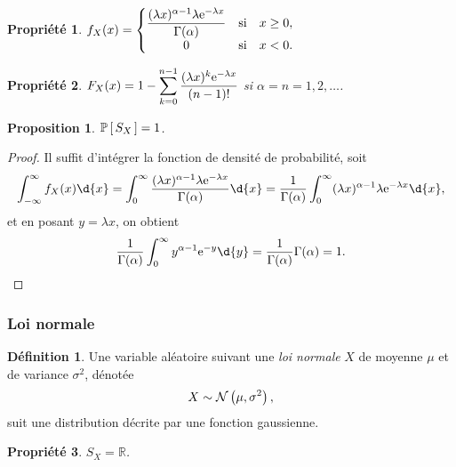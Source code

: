 \documentclass[11pt]{article}
\makeatletter
\renewcommand\P[1]{%
	\ensuremath{%
		\mathbb{P}\left[\,#1\,\right]%
	}%
}%
\newcommand\e{%
	\ensuremath{%
		\mathrm{e}%
	}%
}%
\newcommand\Norm[2]{%
	\ensuremath{%
		\mathcal{N}\left(#1,#2\right)%
	}%
}%
\newtheorem*{proposition}{Proposition}
\newtheorem{property}{Propriété}
\theoremstyle{remark}
\theoremstyle{definition}
\newtheorem*{@definition}{Définition}
\newenvironment{definition}{%
	\begin{@definition}%
}{%
	\end{@definition}%
	\setcounter{property}{0}%
}
\makeatother
\begin{document}
\begin{property}
	$f_X(x)=\left\{
		\begin{matrix}
			\dfrac{(\lambda x)^{\alpha-1}\lambda\e^{-\lambda x}}
				{\Gamma(\alpha)} & \text{si} & x\geq 0,\\
			0                    & \text{si} & x<0.\\
		\end{matrix}
	\right.$
\end{property}

\begin{property}
	$F_X(x)=1-\displaystyle\sum_{k=0}^{n-1}\frac{(\lambda x)^k\e^{-\lambda x}}
		{(n-1)!}$ si $\alpha=n=1,2,\dots$.
\end{property}

\begin{proposition}
	$\P{S_X}=1$.
\end{proposition}

\begin{proof}
	Il suffit d'intégrer la fonction de densité de probabilité, soit
	\begin{equation*}
		\int_{-\infty}^\infty f_X(x)\d{x}
		=\int_0^\infty\frac{(\lambda x)^{\alpha-1}\lambda\e^{-\lambda x}}
			{\Gamma(\alpha)}\d{x}
		=\frac{1}{\Gamma(\alpha)}\int_0^\infty(\lambda x)^{\alpha-1}
			\lambda\e^{-\lambda x}\d{x},
	\end{equation*}
	et en posant $y=\lambda x$, on obtient
	\begin{equation*}
		\frac{1}{\Gamma(\alpha)}\int_0^\infty y^{\alpha-1}\e^{-y}\d{y}
		=\frac{1}{\Gamma(\alpha)}\Gamma{(\alpha)}=1.\qedhere
	\end{equation*}
\end{proof}

\subsubsection{Loi normale}
\begin{definition}
	Une variable aléatoire suivant une \textit{loi normale} $X$ de moyenne
	$\mu$ et de variance $\sigma^2$, dénotée
	\begin{equation*}
		X\sim\Norm{\mu}{\sigma^2},
	\end{equation*}
	suit une distribution décrite par une fonction gaussienne.
\end{definition}

\begin{property}
	$S_X=\mathbb{R}$.
\end{property}
\end{document}
